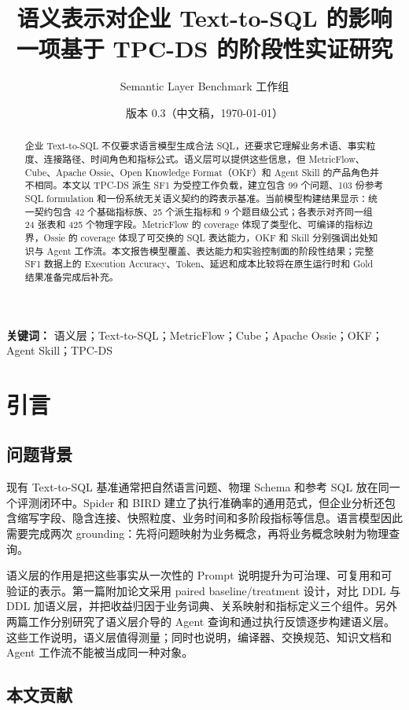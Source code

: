 \documentclass[UTF8,a4paper,12pt]{ctexart}
\title{\heiti 语义表示对企业 Text-to-SQL 的影响\\
\large 一项基于 TPC-DS 的阶段性实证研究}
\author{Semantic Layer Benchmark 工作组}
\date{版本 0.3（中文稿，\today）}
\begin{document}
\maketitle

\begin{abstract}
企业 Text-to-SQL 不仅要求语言模型生成合法 SQL，还要求它理解业务术语、事实粒度、连接路径、时间角色和指标公式。语义层可以提供这些信息，但 MetricFlow、Cube、Apache Ossie、Open Knowledge Format（OKF）和 Agent Skill 的产品角色并不相同。本文以 TPC-DS 派生 SF1 为受控工作负载，建立包含 99 个问题、103 份参考 SQL formulation 和一份系统无关语义契约的跨表示基准。当前模型构建结果显示：统一契约包含 42 个基础指标族、25 个派生指标和 9 个题目级公式；各表示对齐同一组 24 张表和 425 个物理字段。MetricFlow 的 coverage 体现了类型化、可编译的指标边界，Ossie 的 coverage 体现了可交换的 SQL 表达能力，OKF 和 Skill 分别强调出处知识与 Agent 工作流。本文报告模型覆盖、表达能力和实验控制面的阶段性结果；完整 SF1 数据上的 Execution Accuracy、Token、延迟和成本比较将在原生运行时和 Gold 结果准备完成后补充。
\end{abstract}

\noindent\textbf{关键词：} 语义层；Text-to-SQL；MetricFlow；Cube；Apache Ossie；OKF；Agent Skill；TPC-DS

\section{引言}

\subsection{问题背景}

现有 Text-to-SQL 基准通常把自然语言问题、物理 Schema 和参考 SQL 放在同一个评测闭环中。Spider 和 BIRD 建立了执行准确率的通用范式\cite{spider,bird}，但企业分析还包含缩写字段、隐含连接、快照粒度、业务时间和多阶段指标等信息。语言模型因此需要完成两次 grounding：先将问题映射为业务概念，再将业务概念映射为物理查询。

语义层的作用是把这些事实从一次性的 Prompt 说明提升为可治理、可复用和可验证的表示。第一篇附加论文采用 paired baseline/treatment 设计，对比 DDL 与 DDL 加语义层，并把收益归因于业务词典、关系映射和指标定义三个组件\cite{ortiz2026}。另外两篇工作分别研究了语义层介导的 Agent 查询和通过执行反馈逐步构建语义层\cite{kim2026,lee2026}。这些工作说明，语义层值得测量；同时也说明，编译器、交换规范、知识文档和 Agent 工作流不能被当成同一种对象。

\subsection{本文贡献}
\end{document}
